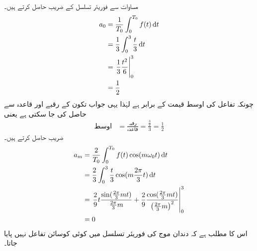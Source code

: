 مساوات  سے فوریئر تسلسل کے  ضریب  حاصل کرتے ہیں۔
\begin{align*}
a_0&=\frac{1}{T_0}\int_0^{T_0} f(t) \dif t\\
&=\frac{1}{3}\int_0^3 \frac{t}{3} \dif t\\
&=\left. \frac{1}{3} \frac{t^2}{6} \right|_0^3\\
&=\frac{1}{2}
\end{align*}
چونکہ  تفاعل کی اوسط قیمت کے برابر ہے لہٰذا یہی جواب تکون کے رقبے  اور قاعدہ  سے حاصل کی جا سکتی ہے یعنی
\begin{align*}
\text{اوسط}&=\frac{\text{رقبہ}}{\text{قاعدہ}}=\frac{\frac{3}{2}}{3}=\frac{1}{2}
\end{align*}
 ضریب   حاصل کرتے ہیں۔
\begin{align*}
a_m&=\frac{2}{T_0}\int_0^{T_0} f(t)\cos (m\omega_0 t) \dif t\\
&=\frac{2}{3}\int_0^3 \frac{t}{3} \cos (m \frac{2\pi}{3} t) \dif t\\
&=\left. \frac{2}{9}t \frac{\sin(\frac{2\pi}{3}mt)}{\frac{2\pi}{3}m}+\frac{2}{9}\frac{\cos(\frac{2\pi}{3}mt)}{\left(\frac{2\pi}{3}m\right)^2}\right|_0^3\\
&=0
\end{align*}
اس کا مطلب ہے کہ دندان موج کی فوریئر تسلسل میں کوئی کوسائن تفاعل نہیں پایا جاتا۔


